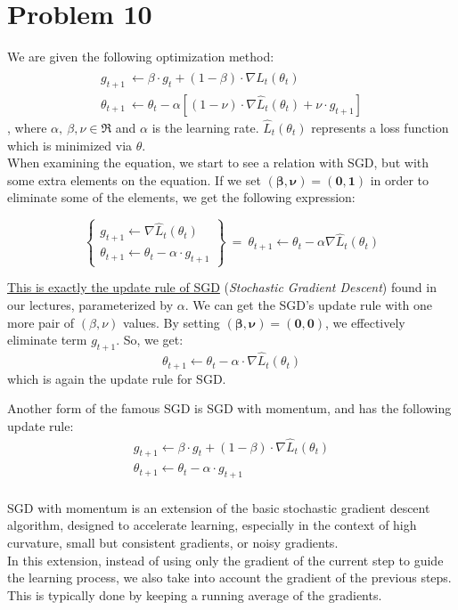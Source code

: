 \section{Problem 10}

We are given the following optimization method:
\begin{equation}
\begin{array}{l}{{g_{t+1}\ \leftarrow\beta\cdot g_{t}+(1-\beta)\cdot\nabla \hat{L}_{t}(\theta_{t})}}\\ {{\theta_{t+1}\ \leftarrow\theta_{t}-\alpha\left[(1-\nu)\cdot\nabla\hat{L}_{t}(\theta_{t})+\nu\cdot g_{t+1}\right]}}\end{array}
\label{eq:qhm_equation}
\end{equation}
, where $\alpha,\ \beta, \nu \in \Re$ and $\alpha$ is the learning rate.
$\hat{L}_{t}\left(\theta_{t}\right)$ represents a loss function which is minimized via $\theta$.\\

When examining the equation, we start to see a relation with SGD, but with some extra elements on the equation.
If we set $\mathbf{\left(\beta, \nu\right) = \left(0,1\right)}$ in order to eliminate some of the elements, we get the following expression:

\[
\left\{
\begin{array}{l}
	g_{t+1} \leftarrow \nabla \hat{L}_{t}\left(\theta_{t}\right)\\
	\theta_{t+1}\leftarrow\theta_{t}-\alpha \cdot g_{t+1}
\end{array}
\right\} \ =\  \theta_{t+1} \leftarrow \theta_{t} - \alpha \nabla \hat{L}_{t} \left(\theta_{t}\right)
\]
\vspace{1mm}

\underline{This is exactly the update rule of SGD} (\textit{Stochastic Gradient Descent}) found in our lectures, parameterized by $\alpha$.
We can get the SGD's update rule with one more pair of $\left(\beta, \nu  \right)$ values. By setting $\mathbf{\left(\beta, \nu\right) = \left(0,0\right)}$, we effectively eliminate term $g_{t+1}$. So, we get:
\[
\theta_{t+1}\leftarrow\theta_{t}-\alpha\cdot\nabla\hat{L}_{t}(\theta_{t})
\]
which is again the update rule for SGD.

Another form of the famous SGD is SGD with momentum, and has the following update rule:
\[
\begin{array}{l}
	{{g_{t+1}\leftarrow\beta\cdot g_{t}+(1-\beta) \cdot \nabla \hat{L}_{t}(\theta_{t})}}\\ {{\theta_{t+1}\leftarrow\theta_{t}-\alpha\cdot g_{t+1}}}
	\end{array}
\]
\\
SGD with momentum is an extension of the basic stochastic gradient descent algorithm, designed to accelerate learning, especially in the context of high curvature, small but consistent gradients, or noisy gradients. \\
In this extension, instead of using only the gradient of the current step to guide the learning process, we also take into account the gradient of the previous steps. This is typically done by keeping a running average of the gradients.\\

